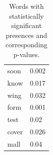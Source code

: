 \documentclass[12pt, oneside]{article}   	%
\begin{document}
\begin{table}[H]
\begin{tabular}[t]{l|l}
soon        & 0.002    \\
know        & 0.017    \\
wing        & 0.032    \\
form        & 0.001    \\
test        & 0.02     \\
cover       & 0.026    \\
mall        & 0.04     \\
\end{tabular}
\caption{\label{table:word_p_values}Words with statistically significant presences and corresponding p-values.}
\end{table}

\end{document}

